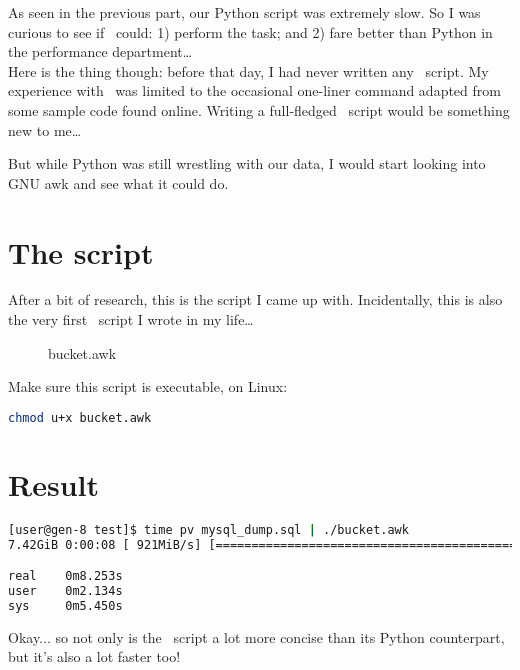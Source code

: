 \medskip

As seen in the previous part, our Python script was extremely slow. So I was curious to see if \awk\ could: 1) perform the task; and 2) fare better than Python in the performance department\dots \\

Here is the thing though: before that day, I had never written any \awk\ script. 
My experience with \awk\ was limited to the occasional one-liner command adapted from some sample code found online. Writing a full-fledged \awk\ script would be something new to me\dots\

But while Python was still wrestling with our data, I would start looking into GNU awk and see what it could do. \\



\newpage

\section*{The script}

After a bit of research, this is the script I came up with. Incidentally, this is also the very first \awk\ script I wrote in my life\dots
\begin{figure}[h]
	\caption{bucket.awk}
	
\end{figure}

\medskip


Make sure this script is executable, on Linux:
\begin{lstlisting}[language=sh]
chmod u+x bucket.awk
\end{lstlisting}


\newpage

\section*{Result}

\begin{lstlisting}[language=sh]
[user@gen-8 test]$ time pv mysql_dump.sql | ./bucket.awk
7.42GiB 0:00:08 [ 921MiB/s] [====================================================>] 100%

real	0m8.253s
user	0m2.134s
sys		0m5.450s
\end{lstlisting}

Okay... so not only is the \gawk\ script a lot more concise than its Python counterpart, but it's also a lot faster too! \\

